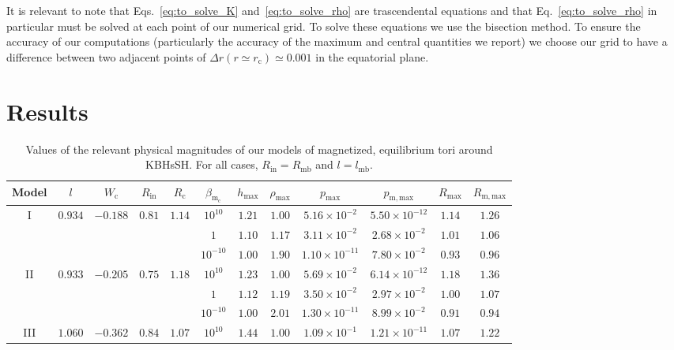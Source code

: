 \documentclass[twocolumn,aps,showpacs,showkeys,prd,superscriptaddress,byrevtex, amsmath]{revtex4-1}
\begin{document}
It is relevant to note that Eqs.~\eqref{eq:to_solve_K} and~\eqref{eq:to_solve_rho} are trascendental equations and that Eq.~\eqref{eq:to_solve_rho} in particular must be solved at each point of our numerical grid. To solve these equations we use the bisection method. To ensure the accuracy of our computations (particularly the accuracy of the maximum and central quantities we report) we choose our grid to have a difference between two adjacent points of $\Delta r (r \simeq r_{\mathrm{c}}) \simeq 0.001$ in the equatorial plane.

\section{Results}
\label{results}

\begin{table}[t]
\caption{Values of the relevant physical magnitudes of our models of magnetized, equilibrium tori around KBHsSH. For all cases,  $R_{\mathrm{in}} = R_{\mathrm{mb}}$ and $l = l_{\mathrm{mb}}$.}       
\label{HBH_disk_parameters}      
\centering          
\begin{tabular}{c c c c c  c c c c c c c}
\hline\hline       
 Model & $l$ & $W_{\mathrm{c}}$ & $R_{\mathrm{in}}$ & $R_{\mathrm{c}}$ &  $\beta_{\mathrm{m_{\mathrm{c}}}}$ & $h_{\mathrm{max}}$ & $\rho_{\mathrm{max}}$ & $p_{\mathrm{max}}$ & $p_{\mathrm{m, max}}$ & $R_{\mathrm{max}}$ & $R_{\mathrm{m, max}}$\\ 
\hline           
I & $0.934$ & $-0.188$ & $0.81$ & $1.14$ & $10^{10}$ & $1.21$ & $1.00$ & $5.16 \times 10^{-2}$ & $5.50 \times 10^{-12}$ & $1.14$ & $1.26$\\ 
 \hline 
 &  &  &  &  & $1$ & $1.10$ & $1.17$ & $3.11 \times 10^{-2}$ & $2.68 \times 10^{-2}$ & $1.01$ & $1.06$\\ 
 \hline 
 &  &  &  &  & $10^{-10}$ & $1.00$ & $1.90$ & $1.10 \times 10^{-11}$ & $7.80 \times 10^{-2}$ & $0.93$ & $0.96$\\ 
 \hline 
II & $0.933$ & $-0.205$ & $0.75$ & $1.18$ & $10^{10}$ & $1.23$ & $1.00$ & $5.69 \times 10^{-2}$ & $6.14 \times 10^{-12}$ & $1.18$ & $1.36$\\ 
 \hline 
 &  &  &  &  & $1$ & $1.12$ & $1.19$ & $3.50 \times 10^{-2}$ & $2.97 \times 10^{-2}$ & $1.00$ & $1.07$\\ 
 \hline 
 &  &  &  &  & $10^{-10}$ & $1.00$ & $2.01$ & $1.30 \times 10^{-11}$ & $8.99 \times 10^{-2}$ & $0.91$ & $0.94$ \\ 
 \hline 
III & $1.060$ & $-0.362$ & $0.84$ & $1.07$ & $10^{10}$ & $1.44$ & $1.00$ & $1.09 \times 10^{-1}$ & $1.21 \times 10^{-11}$ & $1.07$ & $1.22$\\ 

\end{tabular}
\end{table}
\end{document}
